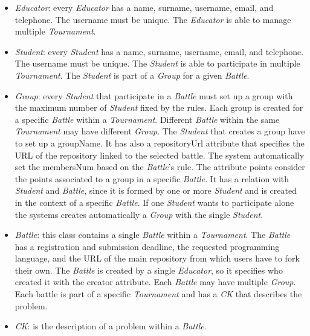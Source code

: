 \documentclass[12pt, a4paper]{report}
\begin{document}
    \begin{itemize}
        \item \textit{Educator}: every \textit{Educator} has a name, surname, username, email, and telephone. 
            The username must be unique. 
            The \textit{Educator} is able to manage multiple \textit{Tournament}. 
        \item \textit{Student}: every \textit{Student} has a name, surname, username, email, and telephone. 
            The username must be unique. 
            The \textit{Student} is able to participate in multiple \textit{Tournament}. 
            The \textit{Student} is part of a \textit{Group} for a given \textit{Battle}.     
        \item \textit{Group}: every \textit{Student} that participate in a \textit{Battle} must set up a group with the maximum number of \textit{Student} fixed by the rules. 
            Each group is created for a specific \textit{Battle} within a \textit{Tournament}. 
            Different \textit{Battle} within the same \textit{Tournament} may have different \textit{Group}. 
            The \textit{Student} that creates a group have to set up a groupName. 
            It has also a repositoryUrl attribute that specifies the URL of the repository linked to the selected battle. 
            The system automatically set the membersNum based on the \textit{Battle}'s rule. 
            The attribute points consider the points associated to a group in a specific \textit{Battle}. 
            It has a relation with \textit{Student} and \textit{Battle}, since it is formed by one or more \textit{Student} and is created in the context of a specific \textit{Battle}. 
            If one \textit{Student} wants to participate alone the systems creates automatically a \textit{Group} with the single \textit{Student}. 
        \item \textit{Battle}: this class contains a single \textit{Battle} within a \textit{Tournament}.
            The \textit{Battle} has a registration and submission deadline, the requested programming language, and the URL of the main repository from which users have to fork their own.
            The \textit{Battle} is created by a single \textit{Educator}, so it specifies who created it with the creator attribute. 
            Each \textit{Battle} may have multiple \textit{Group}.
            Each battle is part of a specific \textit{Tournament} and has a \textit{CK} that describes the problem. 
        \item \textit{CK}: is the description of a problem within a \textit{Battle}. 

\end{itemize}
\end{document}
